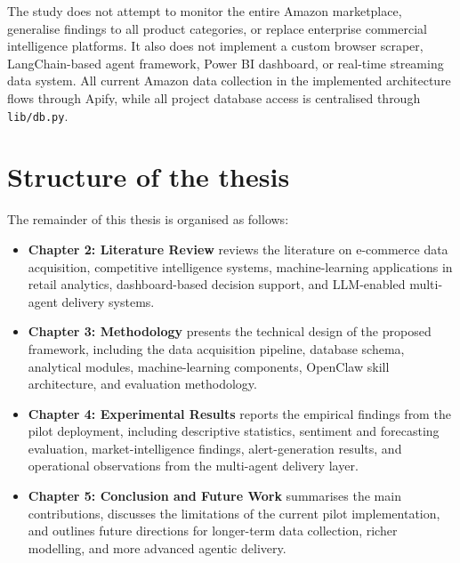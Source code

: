 The study does not attempt to monitor the entire Amazon marketplace,
generalise findings to all product categories, or replace enterprise
commercial intelligence platforms. It also does not implement a custom
browser scraper, LangChain-based agent framework, Power BI dashboard, or
real-time streaming data system. All current Amazon data collection in
the implemented architecture flows through Apify, while all project
database access is centralised through \texttt{lib/db.py}.

\section{Structure of the thesis}

The remainder of this thesis is organised as follows:
\begin{itemize}
    \item \textbf{Chapter 2: Literature Review} reviews the literature
    on e-commerce data acquisition, competitive intelligence systems,
    machine-learning applications in retail analytics, dashboard-based
    decision support, and LLM-enabled multi-agent delivery systems.

    \item \textbf{Chapter 3: Methodology} presents the technical design
    of the proposed framework, including the data acquisition pipeline,
    database schema, analytical modules, machine-learning components,
    OpenClaw skill architecture, and evaluation methodology.

    \item \textbf{Chapter 4: Experimental Results} reports the empirical
    findings from the pilot deployment, including descriptive statistics,
    sentiment and forecasting evaluation, market-intelligence findings,
    alert-generation results, and operational observations from the
    multi-agent delivery layer.

    \item \textbf{Chapter 5: Conclusion and Future Work} summarises the
    main contributions, discusses the limitations of the current pilot
    implementation, and outlines future directions for longer-term data
    collection, richer modelling, and more advanced agentic delivery.
\end{itemize}

